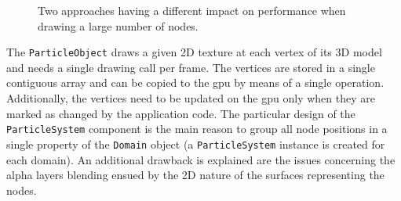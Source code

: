 \begin{figure}
	\hfill
  \caption[Two different approaches to render a large number of nodes.]{Two approaches having a different impact on performance when drawing a large number of nodes.}%
  \label{fig:node-draw}
\end{figure}

The \texttt{ParticleObject} draws a given 2D texture at each vertex of its 3D model and needs a single drawing call per frame. The vertices are stored in a single contiguous array and can be copied to the \gls{gpu} by means of a single operation. Additionally, the vertices need to be updated on the \gls{gpu} only when they are marked as changed by the application code. The particular design of the \texttt{ParticleSystem} component is the main reason to group all node positions in a single property of the \texttt{Domain} object (a \texttt{ParticleSystem} instance is created for each domain). An additional drawback is explained are the issues concerning the alpha layers blending ensued by the 2D nature of the surfaces representing the nodes.

